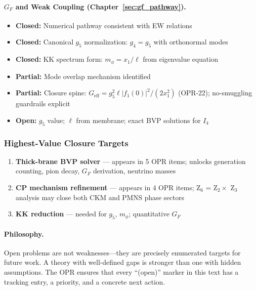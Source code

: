 \paragraph{\texorpdfstring{$G_F$ and Weak Coupling (Chapter~\ref{sec:gf_pathway}).}{GF and Weak Coupling.}}
\begin{itemize}[nosep]
    \item \textcolor{OliveGreen}{\textbf{Closed:}} Numerical pathway consistent with EW relations \tagDc{}
    \item \textcolor{OliveGreen}{\textbf{Closed:}} Canonical $g_5$ normalization: $g_4 = g_5$ with orthonormal modes \tagDc{}
    \item \textcolor{OliveGreen}{\textbf{Closed:}} KK spectrum form: $m_\phi = x_1/\ell$ from eigenvalue equation \tagDc{}
    \item \textcolor{YellowOrange}{\textbf{Partial:}} Mode overlap mechanism identified \tagP{}
    \item \textcolor{YellowOrange}{\textbf{Partial:}} Closure spine: $G_{\text{eff}} = g_5^2 \ell |f_1(0)|^2 / (2x_1^2)$ \tagDc{} (OPR-22); no-smuggling guardrails explicit
    \item \textcolor{BrickRed}{\textbf{Open:}} $g_5$ value; $\ell$ from membrane; exact BVP solutions for $I_4$
\end{itemize}

\subsubsection{Highest-Value Closure Targets}

\begin{enumerate}
    \item \textbf{Thick-brane BVP solver} --- appears in 5 OPR items; unlocks generation
          counting, pion decay, $G_F$ derivation, neutrino masses
    \item \textbf{CP mechanism refinement} --- appears in 4 OPR items; Z$_6$ = Z$_2 \times$ Z$_3$
          analysis may close both CKM and PMNS phase sectors
    \item \textbf{KK reduction} --- needed for $g_5$, $m_\phi$; quantitative $G_F$
\end{enumerate}

\paragraph{Philosophy.}
Open problems are not weaknesses---they are precisely enumerated targets for future
work. A theory with well-defined gaps is stronger than one with hidden assumptions.
The OPR ensures that every ``(open)'' marker in this text has a tracking entry,
a priority, and a concrete next action.

